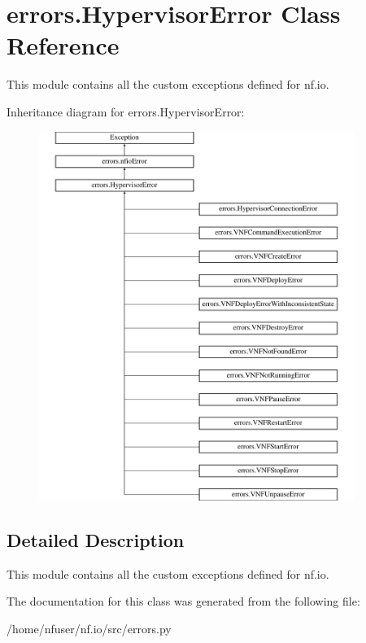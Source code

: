 \hypertarget{classerrors_1_1HypervisorError}{\section{errors.\-Hypervisor\-Error Class Reference}
\label{classerrors_1_1HypervisorError}
}


This module contains all the custom exceptions defined for nf.\-io.  


Inheritance diagram for errors.\-Hypervisor\-Error\-:\begin{figure}[H]
\begin{center}
\leavevmode
\includegraphics[height=12.000000cm]{classerrors_1_1HypervisorError}
\end{center}
\end{figure}


\subsection{Detailed Description}
This module contains all the custom exceptions defined for nf.\-io. 

The documentation for this class was generated from the following file\-:\begin{DoxyCompactItemize}
\item 
/home/nfuser/nf.\-io/src/errors.\-py\end{DoxyCompactItemize}
